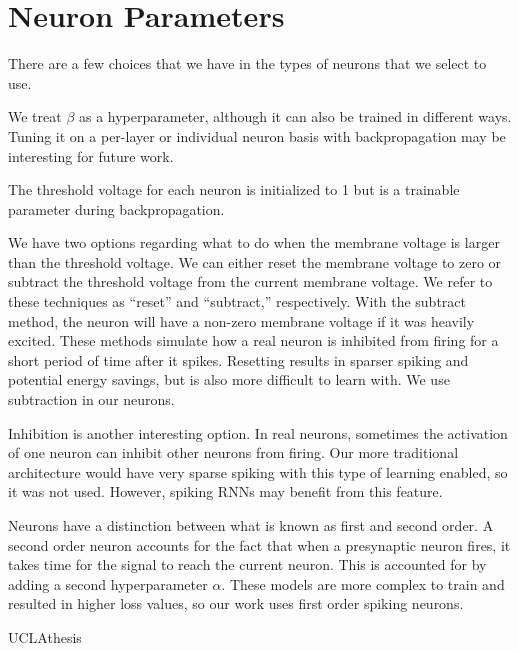 \documentclass [MS] {UCLAthesis}
\begin{document}

\section{Neuron Parameters}

There are a few choices that we have in the types of neurons that we select to use.

We treat $\beta$ as a hyperparameter, although it can also be trained in different ways. Tuning it on a per-layer or individual neuron basis with backpropagation may be interesting for future work.

The threshold voltage for each neuron is initialized to 1 but is a trainable parameter during backpropagation.

We have two options regarding what to do when the membrane voltage is larger than the threshold voltage. We can either reset the membrane voltage to zero or subtract the threshold voltage from the current membrane voltage. We refer to these techniques as ``reset'' and ``subtract,'' respectively. With the subtract method, the neuron will have a non-zero membrane voltage if it was heavily excited. These methods simulate how a real neuron is inhibited from firing for a short period of time after it spikes. Resetting results in sparser spiking and potential energy savings, but is also more difficult to learn with. We use subtraction in our neurons.

Inhibition is another interesting option. In real neurons, sometimes the activation of one neuron can inhibit other neurons from firing. Our more traditional architecture would have very sparse spiking with this type of learning enabled, so it was not used. However, spiking RNNs may benefit from this feature.

Neurons have a distinction between what is known as first and second order. A second order neuron accounts for the fact that when a presynaptic neuron fires, it takes time for the signal to reach the current neuron. This is accounted for by adding a second hyperparameter $\alpha$. These models are more complex to train and resulted in higher loss values, so our work uses first order spiking neurons.


 {UCLAthesis}

\end{document}
